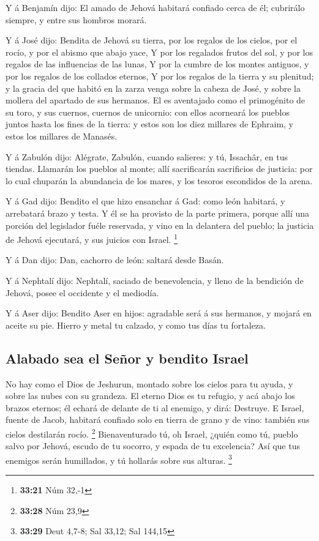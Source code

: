  Y á Benjamín dijo: El amado de Jehová habitará confiado
cerca de él; cubrirálo siempre, y entre sus hombros morará.

 Y á José dijo: Bendita de Jehová su tierra, por los
regalos de los cielos, por el rocío, y por el abismo que abajo yace,
 Y por los regalados frutos del sol, y por los regalos de
las influencias de las lunas,  Y por la cumbre de los
montes antiguos, y por los regalos de los collados eternos,
 Y por los regalos de la tierra y su plenitud; y la
gracia del que habitó en la zarza venga sobre la cabeza de José, y sobre
la mollera del apartado de sus hermanos.  El es
aventajado como el primogénito de su toro, y sus cuernos, cuernos de
unicornio: con ellos acorneará los pueblos juntos hasta los fines de la
tierra: y estos son los diez millares de Ephraim, y estos los millares
de Manasés.

 Y á Zabulón dijo: Alégrate, Zabulón, cuando salieres: y
tú, Issachâr, en tus tiendas.  Llamarán los pueblos al
monte; allí sacrificarán sacrificios de justicia: por lo cual chuparán
la abundancia de los mares, y los tesoros escondidos de la arena.

 Y á Gad dijo: Bendito el que hizo ensanchar á Gad: como
león habitará, y arrebatará brazo y testa.  Y él se ha
provisto de la parte primera, porque allí una porción del legislador
fuéle reservada, y vino en la delantera del pueblo; la justicia de
Jehová ejecutará, y sus juicios con Israel. \footnote{\textbf{33:21} Núm
  32,-1}

 Y á Dan dijo: Dan, cachorro de león: saltará desde
Basán.

 Y á Nephtalí dijo: Nephtalí, saciado de benevolencia, y
lleno de la bendición de Jehová, posee el occidente y el mediodía.

 Y á Aser dijo: Bendito Aser en hijos: agradable será á
sus hermanos, y mojará en aceite su pie.  Hierro y metal
tu calzado, y como tus días tu fortaleza.

\hypertarget{alabado-sea-el-seuxf1or-y-bendito-israel}{%
\subsection{Alabado sea el Señor y bendito
Israel}\label{alabado-sea-el-seuxf1or-y-bendito-israel}}

 No hay como el Dios de Jeshurun, montado sobre los
cielos para tu ayuda, y sobre las nubes con su grandeza. 
El eterno Dios es tu refugio, y acá abajo los brazos eternos; él echará
de delante de ti al enemigo, y dirá: Destruye.  E Israel,
fuente de Jacob, habitará confiado solo en tierra de grano y de vino:
también sus cielos destilarán rocío. \footnote{\textbf{33:28} Núm 23,9}
 Bienaventurado tú, oh Israel, ¿quién como tú, pueblo
salvo por Jehová, escudo de tu socorro, y espada de tu excelencia? Así
que tus enemigos serán humillados, y tú hollarás sobre sus alturas.
\footnote{\textbf{33:29} Deut 4,7-8; Sal 33,12; Sal 144,15}


